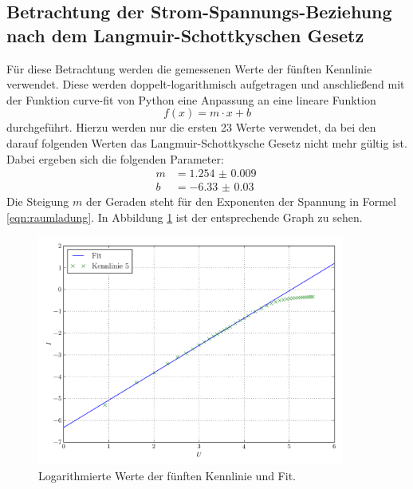 \documentclass[
  bibliography=totoc,     %
  captions=tableheading,  %
  titlepage=firstiscover, %
]{scrartcl}
\begin{document}
\subsection{Betrachtung der Strom-Spannungs-Beziehung nach dem Langmuir-Schottkyschen Gesetz}
Für diese Betrachtung werden die gemessenen Werte der fünften Kennlinie verwendet.
Diese werden doppelt-logarithmisch aufgetragen und anschließend mit der Funktion
curve-fit von Python eine Anpassung an eine lineare Funktion
\begin{equation}
  f(x) = m \cdot x + b
  \label{eqn:linear}
\end{equation}
durchgeführt. Hierzu werden nur die ersten 23 Werte verwendet, da bei den darauf
folgenden Werten das Langmuir-Schottkysche Gesetz nicht mehr gültig ist.
Dabei ergeben sich die folgenden Parameter:
\begin{align*}
  m &= \SI{1.254(9)}{} \\
  b &= \SI{-6.33(3)}{}
\end{align*}
Die Steigung $m$ der Geraden steht für den Exponenten der Spannung in Formel \eqref{eqn:raumladung}.
In Abbildung \ref{fig:plot2} ist der entsprechende Graph zu sehen.
\begin{figure}[H]
  \centering
  \includegraphics[width=0.9\textwidth]{Plot2.pdf}
  \caption{Logarithmierte Werte der fünften Kennlinie und Fit.}
  \label{fig:plot2}
\end{figure}
\end{document}

